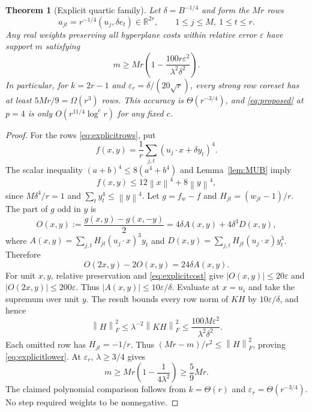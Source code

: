 \documentclass[11pt,letterpaper]{article}
\newtheorem{theorem}{Theorem}[section]
\theoremstyle{definition}
\theoremstyle{remark}
\numberwithin{equation}{section}
\newcommand{\R}{\mathbb R}
\newcommand{\eps}{\varepsilon}
\newcommand{\norm}[1]{\left\lVert#1\right\rVert}
\begin{document}
\begin{theorem}[Explicit quartic family]\label{thm:explicit}
Let $\delta=B^{-1/4}$ and form the $Mr$ rows
\begin{equation}\label{eq:explicitrows}
 a_{jt}=r^{-1/4}(u_j,\delta e_t)\in\R^{2r},\qquad 1\le j\le M,\ 1\le t\le r.
\end{equation}
Any real weights preserving all hyperplane costs within relative error $\eps$ have support $m$ satisfying
\begin{equation}\label{eq:explicitlower}
 m\ge Mr\left(1-\frac{100r\eps^2}{\lambda^2\delta^2}\right).
\end{equation}
In particular, for $k=2r-1$ and $\eps_r=\delta/(20\sqrt r)$, every strong row coreset has at least $5Mr/9=\Omega(r^3)$ rows. This accuracy is $\Theta(r^{-3/4})$, and \eqref{eq:proposed} at $p=4$ is only $O(r^{11/4}\log^c r)$ for any fixed $c$.
\end{theorem}
\begin{proof}
For the rows \eqref{eq:explicitrows}, put
\[
 f(x,y)=\frac1r\sum_{j,t}(u_j\cdot x+\delta y_t)^4.
\]
The scalar inequality $(a+b)^4\le8(a^4+b^4)$ and Lemma~\ref{lem:MUB} imply
\begin{equation}\label{eq:explicitcost}
 f(x,y)\le12\norm{x}^4+8\norm{y}^4,
\end{equation}
since $M\delta^4/r=1$ and $\sum_ty_t^4\le\norm{y}^4$.
Let $g=f_w-f$ and $H_{jt}=(w_{jt}-1)/r$. The part of $g$ odd in $y$ is
\[
 O(x,y):=\frac{g(x,y)-g(x,-y)}2
 =4\delta A(x,y)+4\delta^3D(x,y),
\]
where $A(x,y)=\sum_{j,t}H_{jt}(u_j\cdot x)^3y_t$ and
$D(x,y)=\sum_{j,t}H_{jt}(u_j\cdot x)y_t^3$. Therefore
\begin{equation}\label{eq:fourqueries}
 O(2x,y)-2O(x,y)=24\delta A(x,y).
\end{equation}
For unit $x,y$, relative preservation and \eqref{eq:explicitcost} give
$|O(x,y)|\le20\eps$ and $|O(2x,y)|\le200\eps$. Thus
$|A(x,y)|\le10\eps/\delta$. Evaluate at $x=u_i$ and take the supremum over unit $y$. The result bounds every row norm of $KH$ by $10\eps/\delta$, and hence
\[
 \norm{H}_F^2\le\lambda^{-2}\norm{KH}_F^2
 \le\frac{100M\eps^2}{\lambda^2\delta^2}.
\]
Each omitted row has $H_{jt}=-1/r$. Thus $(Mr-m)/r^2\le\norm{H}_F^2$, proving \eqref{eq:explicitlower}. At $\eps_r$, $\lambda\ge3/4$ gives
\[
 m\ge Mr\left(1-\frac1{4\lambda^2}\right)\ge\frac59Mr.
\]
The claimed polynomial comparison follows from $k=\Theta(r)$ and $\eps_r=\Theta(r^{-3/4})$. No step required weights to be nonnegative.
\end{proof}
\end{document}
